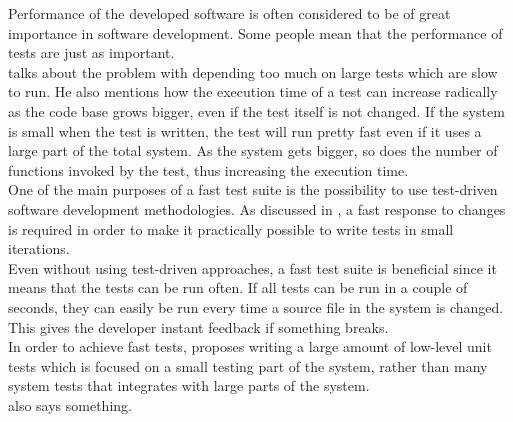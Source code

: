 
Performance of the developed software is often considered to be of great
importance in software development. Some people mean that the
performance of tests are just as important.\\

\citet{video:fast_slow_test} talks about the problem with depending too
much on large tests which are slow to run. He also mentions how the
execution time of a test can increase radically as the code base grows
bigger, even if the test itself is not changed. If the system is small
when the test is written, the test will run pretty fast even if it uses
a large part of the total system. As the system gets bigger, so does the
number of functions invoked by the test, thus increasing the execution
time.\\

One of the main purposes of a fast test suite is the possibility to use
test-driven software development methodologies. As discussed in
, a fast response to changes is required in order to make
it practically possible to write tests in small iterations.\\

Even without using test-driven approaches, a fast test suite is
beneficial since it means that the tests can be run often. If all tests
can be run in a couple of seconds, they can easily be run every time a
source file in the system is changed. This gives the developer instant
feedback if something breaks.\\

In order to achieve fast tests, \citeauthor{video:fast_slow_test}
proposes writing a large amount of low-level unit tests which is focused
on a small testing part of the system, rather than many system tests
that integrates with large parts of the system.\\

\citet{video:fast_rails_tests} also says something.
